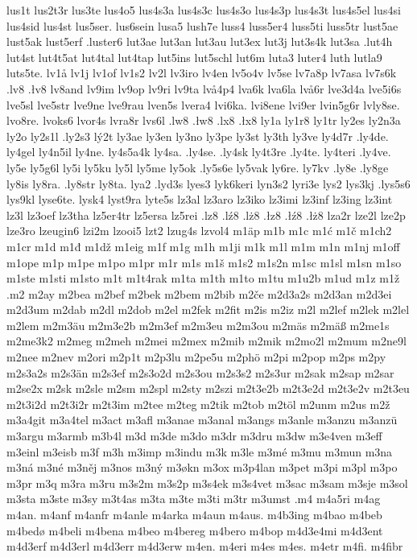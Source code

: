 {{lus1t
lus2t3r
lus3te
lus4o5
lus4s3a
lus4s3c
lus4s3o
lus4s3p
lus4s3t
lus4s5el
lus4si
lus4sid
lus4st
lus5ser.
lus6sein
lusa5
lush7e
luss4
luss5er4
luss5ti
luss5tr
lust5ae
lust5ak
lust5erf
.luster6
lut3ae
lut3an
lut3au
lut3ex
lut3j
lut3s4k
lut3sa
.lut4h
lut4st
lut4t5at
lut4tal
lut4tap
lut5ins
lut5schl
lut6m
luta3
luter4
luth
lutla9
luts5te.
lv1å
lv1j
lv1of
lv1s2
lv2l
lv3iro
lv4en
lv5o4v
lv5se
lv7a8p
lv7asa
lv7s6k
.lv8
.łv8
lv8and
lv9im
lv9op
lv9ri
lv9ta
lvå4p4
lva6k
lva6la
lvå6r
lve3d4a
lve5i6s
lve5sl
lve5str
lve9ne
lve9rau
lven5s
lvera4
lvi6ka.
lvi8ene
lvi9er
lvin5g6r
lvly8se.
lvo8re.
lvoks6
lvor4s
lvra8r
lvs6l
.lw8
.łw8
.lx8
.łx8
ly1a
ly1r8
ly1tr
ly2es
ly2n3a
ly2o
ly2s1l
.ly2s3
lý2t
ly3ae
ly3en
ly3no
ly3pe
ly3st
ly3th
ly3ve
ly4d7r
.ly4de.
ly4gel
ly4n5il
ly4ne.
ly4s5a4k
ly4sa.
.ly4se.
.ly4sk
ly4t3re
.ly4te.
ly4teri
.ly4ve.
ly5e
ly5g6l
ly5i
ly5ku
ly5l
ly5me
ly5ok
.ly5s6e
ly5vak
ly6re.
ly7kv
.ly8e
.ly8ge
ly8is
ly8ra.
.ly8str
ly8ta.
lya2
.lyd3s
lyes3
lyk6keri
lyn3s2
lyri3e
lys2
lys3kj
.lys5s6
lys9kl
lyse6te.
lysk4
lyst9ra
lyte5s
lz3al
lz3aro
lz3iko
lz3imi
lz3inf
lz3ing
lz3int
lz3l
lz3oef
lz3tha
lz5er4tr
lz5ersa
lz5rei
.lz8
.lź8
.lż8
.łz8
.łź8
.łż8
lza2r
lze2l
lze2p
lze3ro
lzeugin6
lzi2m
lzooi5
lzt2
lzug4s
lzvol4
m1äp
m1b
m1c
m1ć
m1č
m1ch2
m1cr
m1d
m1đ
m1dž
m1eig
m1f
m1g
m1h
m1ji
m1k
m1l
m1m
m1n
m1nj
m1off
m1ope
m1p
m1pe
m1po
m1pr
m1r
m1s
m1š
m1s2
m1s2n
m1sc
m1sl
m1sn
m1so
m1ste
m1sti
m1sto
m1t
m1t4rak
m1ta
m1th
m1to
m1tu
m1u2b
m1ud
m1z
m1ž
.m2
m2ay
m2bea
m2bef
m2bek
m2bem
m2bib
m2če
m2d3a2s
m2d3an
m2d3ei
m2d3um
m2dab
m2dl
m2dob
m2el
m2fek
m2fit
m2is
m2iz
m2l
m2lef
m2lek
m2lel
m2lem
m2m3äu
m2m3e2b
m2m3ef
m2m3eu
m2m3ou
m2mäs
m2mäß
m2me1s
m2me3k2
m2meg
m2meh
m2mei
m2mex
m2mib
m2mik
m2mo2l
m2mum
m2ne9l
m2nee
m2nev
m2ori
m2p1t
m2p3lu
m2pe5u
m2phö
m2pi
m2pop
m2ps
m2py
m2s3a2s
m2s3än
m2s3ef
m2s3o2d
m2s3ou
m2s3s2
m2s3ur
m2sak
m2sap
m2sar
m2se2x
m2sk
m2sle
m2sm
m2spl
m2sty
m2szi
m2t3e2b
m2t3e2d
m2t3e2v
m2t3eu
m2t3i2d
m2t3i2r
m2t3im
m2tee
m2teg
m2tik
m2tob
m2töl
m2unm
m2us
m2ž
m3a4git
m3a4tel
m3act
m3afl
m3anae
m3anal
m3angs
m3anle
m3anzu
m3anzü
m3argu
m3armb
m3b4l
m3d
m3de
m3do
m3dr
m3dru
m3dw
m3e4ven
m3eff
m3einl
m3eisb
m3f
m3h
m3imp
m3indu
m3k
m3le
m3mé
m3mu
m3mun
m3na
m3ná
m3né
m3něj
m3nos
m3ný
m3økn
m3ox
m3p4lan
m3pet
m3pi
m3pl
m3po
m3pr
m3q
m3ra
m3ru
m3s2m
m3s2p
m3s4ek
m3s4vet
m3sac
m3sam
m3sje
m3sol
m3sta
m3ste
m3sy
m3t4as
m3ta
m3te
m3ti
m3tr
m3umst
.m4
m4a5ri
m4ag
m4an.
m4anf
m4anfr
m4anle
m4arka
m4aun
m4aus.
m4b3ing
m4bao
m4beb
m4bedø
m4beli
m4bena
m4beo
m4bereg
m4bero
m4bop
m4d3e4mi
m4d3ent
m4d3erf
m4d3erl
m4d3err
m4d3erw
m4en.
m4eri
m4es
m4es.
m4etr
m4fi.
m4fibr
}}
